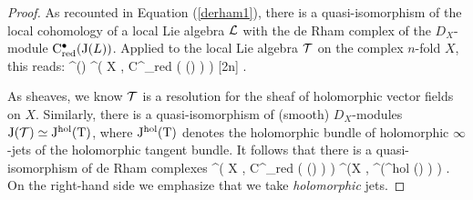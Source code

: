 \documentclass[11pt]{amsart}
\begin{document}
\begin{proof}
As recounted in Equation (\ref{derham1}), there is a quasi-isomorphism of the local cohomology of a local Lie algebra $\mathcal L$ with the de Rham complex of the $D_X$-module ${\rm C}^\bullet_{\rm red} ({\rm J} (L))$.
Applied to the local Lie algebra $\mathcal T$ on the complex $n$-fold $X$, this reads:
\beqn
\cloc^\bu(\cT) \; \simeq \; \Omega^\bu \bigg( X \; , \; {\rm C}^\bu_{\rm red} \left( \jet (\cT) \right) \bigg) [2n] .
\eeqn





As sheaves, we know $\mathcal T$ is a resolution for the sheaf of holomorphic vector fields on $X$. 
Similarly, there is a quasi-isomorphism of (smooth) $D_X$-modules ${\rm J}(\mathcal T) \simeq {\rm J}^{\rm hol} ({\rm T})$, where ${\rm J}^{\rm hol}({\rm T})$ denotes the holomorphic bundle of holomorphic $\infty$-jets of the holomorphic tangent bundle. 
It follows that there is a quasi-isomorphism of de Rham complexes
\beqn\label{smoothhol}
\Omega^\bu \bigg( X \; , \; {\rm C}^\bu_{\rm red} \left( \jet (\cT) \right) \bigg) \; \simeq \; \Omega^\bu \bigg(X \; , \; \cred^\bu\left(\jet^{\rm hol} (\tangent) \right) \bigg) .
\eeqn
On the right-hand side we emphasize that we take {\em holomorphic} jets.


\end{proof}
\end{document}
